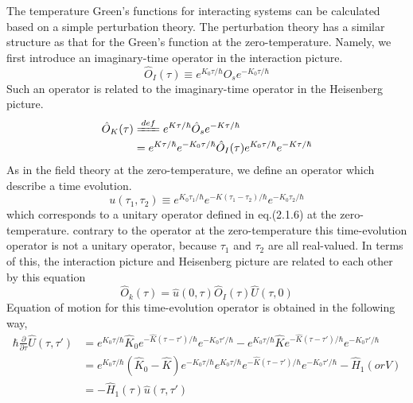 The temperature Green's functions for interacting systems can be calculated based on a simple perturbation theory.
The perturbation theory has a similar structure as that for the Green's function at the zero-temperature.
Namely, we first introduce an imaginary-time operator in the interaction picture.
\begin{equation}
\hat{O}_{I}(\tau) \equiv e^{K_{0} \tau/\hbar}\hat{O}_{s}e^{-K_0\tau/\hbar}
\end{equation}
Such an operator is related to the imaginary-time operator in the Heisenberg picture.
\begin{equation}
\begin{aligned}
\hat{O}_{K}(\tau)& \xlongequal{def} e^{K\tau/\hbar}\hat{O}_{s}e^{-K\tau/\hbar}\\
&=e^{K\tau/\hbar}e^{-K_0\tau/\hbar}\hat{O}_{I}(\tau)e^{K_0\tau/\hbar}e^{-K\tau/\hbar}
\end{aligned}
\end{equation}
As in the field theory at the zero-temperature, we define an operator which describe a time evolution.
\begin{equation}
u(\tau_1,\tau_2)\equiv e^{K_0\tau_1/\hbar}e^{-K(\tau_1-\tau_2)/\hbar}e^{-K_0\tau_2/\hbar}
\end{equation}
which corresponds to a unitary operator defined in eq.(2.1.6) at the zero-temperature.
contrary to the operator at the zero-temperature this time-evolution operator is not a unitary operator, because $\tau_1$ and $\tau_2$ are all real-valued.
In terms of this, the interaction picture and Heisenberg picture are related to each other by this equation
\begin{equation}
\hat{O}_{k}(\tau)=\hat{u}(0,\tau)\hat{O}_{I}(\tau)\hat{U}(\tau,0)
\end{equation}
Equation of motion for this time-evolution operator is obtained in the following way,
\begin{equation}
\begin{aligned}
\hbar\frac{\partial}{\partial\tau}\hat{U}(\tau,\tau')&=e^{K_0\tau/\hbar} \hat{K}_0 e^{-\hat{K}(\tau-\tau')/\hbar} e^{-K_0\tau'/\hbar} -e^{K_0\tau/\hbar} \hat{K} e^{-\hat{K}(\tau-\tau')/\hbar} e^{-K_0\tau'/\hbar}\\
&=e^{K_0\tau/\hbar}(\hat{K}_0-\hat{K}) e^{-K_0\tau/\hbar} e^{K_0\tau/\hbar} e^{-\hat{K}(\tau-\tau')/\hbar} e^{-K_0\tau'/\hbar}-\hat{H}_1(or V)\\
&=-\hat{H}_1(\tau)\hat{u}(\tau,\tau')
\end{aligned}
\end{equation}
